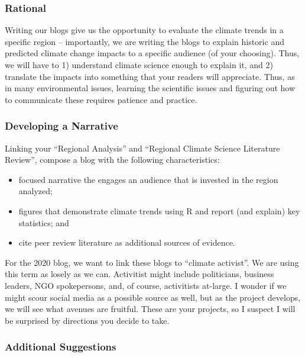 
\subsubsection{Rational}

{\color{red}Writing our blogs give us the opportunity to evaluate the climate trends in a specific region -- importantly, we are writing the blogs to explain historic and predicted climate change impacts to a specific audience (of your choosing). Thus, we will have to 1) understand climate science enough to explain it, and 2) translate the impacts into something that your readers will appreciate. Thus, as in many environmental issues, learning the scientific issues and figuring out how to communicate these requires patience and practice.


\subsubsection{Developing a Narrative}

Linking your ``Regional Analysis'' and ``Regional Climate Science Literature Review'', compose a blog with the following characteristics: 

\begin{itemize}
  \item focused narrative the engages an audience that is invested in the region analyzed; 
  \item figures that demonstrate climate trends using R and report (and explain) key statistics; and  
  \item cite peer review literature as additional sources of evidence.
\end{itemize}

For the 2020 blog, we want to link these blogs to ``climate activist''. We are using this term as losely as we can. Activitist might include politicians, business leaders, NGO spokepersons, and, of course, activitists at-large. I wonder if we might scour social media as a possible source as well, but as the project develops, we will see what avenues are fruitful. These are your projects, so I suspect I will be surprised by directions you decide to take. 

\subsubsection{Additional Suggestions}

}
